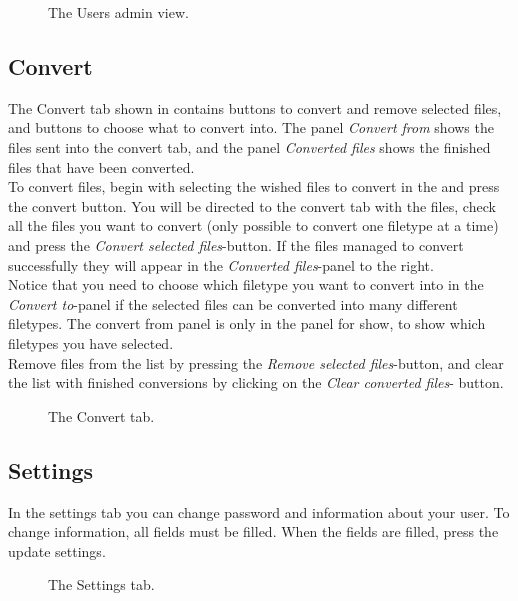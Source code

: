  \begin{figure}[h!]
 \caption{The Users admin view.}
 \label{fig:des_users}
 \end{figure}


\subsection{Convert}

The Convert tab shown in  contains buttons to convert and remove selected files, and buttons to choose what to convert into. The panel \textit{Convert from} shows the files sent into the convert tab, and the panel \textit{Converted files} shows the finished files that have been converted. \\

To convert files, begin with selecting the wished files to convert in the  and press the convert button. You will be directed to the convert tab with the files, check all the files you want to convert (only possible to convert one filetype at a time) and press the \textit{Convert selected files}-button. If the files managed to convert successfully they will appear in the \textit{Converted files}-panel  to the right. \\

Notice that you need to choose which filetype you want to convert into in the \textit{Convert to}-panel if the selected files can be converted into many different filetypes. The convert from panel is only in the panel for show, to show which filetypes you have selected. \\

Remove files from the list by pressing the \textit{Remove selected files}-button, and clear the list with finished conversions by clicking on the \textit{Clear converted files}- button.


 \begin{figure}[h!]
 \caption{The Convert tab.}
 \label{fig:des_convert}
 \end{figure}

\subsection{Settings}

In the settings tab  you can change password and information about your user. To change information, all fields must be filled. When the fields are filled, press the update settings.

 \begin{figure}[h!]
 \caption{The Settings tab.}
 \label{fig:des_settings}
 \end{figure}
